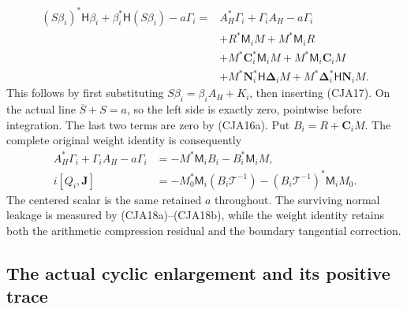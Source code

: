 \documentclass[11pt,a4paper]{article}
\begin{document}
\begin{equation}
 \begin{split}
 (S\beta_i)^*\mathsf H\beta_i+\beta_i^*\mathsf H(S\beta_i)-a\Gamma_i
 ={}&A_H^*\Gamma_i+\Gamma_iA_H-a\Gamma_i\\
 &+R^*\mathsf M_iM+M^*\mathsf M_iR\\
 &+M^*\boldsymbol C_i^*\mathsf M_iM
       +M^*\mathsf M_i\boldsymbol C_iM\\
 &+M^*\boldsymbol N_i^*\mathsf H\boldsymbol\Delta_iM
       +M^*\boldsymbol\Delta_i^*\mathsf H\boldsymbol N_iM .
 \end{split}
 \tag{CJA19}
\end{equation}
This follows by first substituting
\(S\beta_i=\beta_iA_H+K_i\), then inserting (CJA17).
On the actual line \(\overline S+S=a\), so the left side is
exactly zero, pointwise before integration.  The last two terms
are zero by (CJA16a).  Put \(B_i=R+\boldsymbol C_iM\).
The complete original weight identity is consequently
\begin{equation}
 \begin{split}
 A_H^*\Gamma_i+\Gamma_iA_H-a\Gamma_i
   &=-M^*\mathsf M_iB_i-B_i^*\mathsf M_iM,\\
 i[Q_i,\mathbf J]
   &=-M_0^*\mathsf M_i(B_i\mathcal T^{-1})
       -(B_i\mathcal T^{-1})^*\mathsf M_iM_0 .
 \end{split}
 \tag{CJA19a}
\end{equation}
The centered scalar is the same retained \(a\) throughout.
The surviving normal leakage is measured by (CJA18a)--(CJA18b),
while the weight identity retains both the arithmetic compression
residual and the boundary tangential correction.

\subsection{The actual cyclic enlargement and its positive trace}
\end{document}
